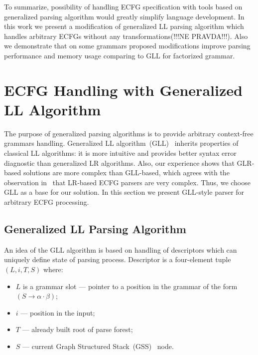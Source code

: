 \documentclass[runningheads,a4paper]{llncs}
\begin{document}
To summarize, possibility of handling ECFG specification with tools based on generalized parsing algorithm would greatly simplify language development.
In this work we present a modification of generalized LL parsing algorithm which handles arbitrary ECFGs without any transformations(!!!NE PRAVDA!!!).
Also we demonstrate that on some grammars proposed modifications improve parsing performance and memory usage comparing to GLL for factorized grammar.

\section{ECFG Handling with Generalized LL Algorithm}%

The purpose of generalized parsing algorithms is to provide arbitrary context-free grammars handling.
Generalized LL algorithm~(GLL)~\cite{scott2010gll} inherits properties of classical LL algorithms: it is more intuitive and provides better syntax error diagnostic than generalized LR algorithms.
Also, our experience shows that GLR-based solutions are more complex than GLL-based, which agrees with the observation in~\cite{ECFG} that LR-based ECFG parsers are very complex. 
Thus, we choose GLL as a base for our solution.
In this section we present GLL-style parser for arbitrary ECFG processing.

\subsection{Generalized LL Parsing Algorithm}%

An idea of the GLL algorithm is based on handling of descriptors which can uniquely define state of parsing process.
Descriptor is a four-element tuple $(L, i, T, S)$ where: 
\begin{itemize}
\item $L$ is a grammar slot --- pointer to a position in the grammar of the form~$(S \to \alpha \cdot \beta)$;
\item $i$ --- position in the input;
\item $T$ --- already built root of parse forest;
\item $S$ --- current Graph Structured Stack~(GSS)~\cite{afroozeh2015faster} node.
\end{itemize}
\end{document}
